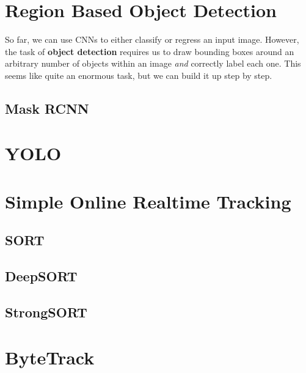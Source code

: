 \documentclass{article}
\begin{document}
\section{Region Based Object Detection}

  So far, we can use CNNs to either classify or regress an input image. However, the task of \textbf{object detection} requires us to draw bounding boxes around an arbitrary number of objects within an image \textit{and} correctly label each one. This seems like quite an enormous task, but we can build it up step by step. 

  \subsection{Mask RCNN}

\section{YOLO}

\section{Simple Online Realtime Tracking} 

  \subsection{SORT}

  \subsection{DeepSORT}

  \subsection{StrongSORT}

\section{ByteTrack}



\end{document}
